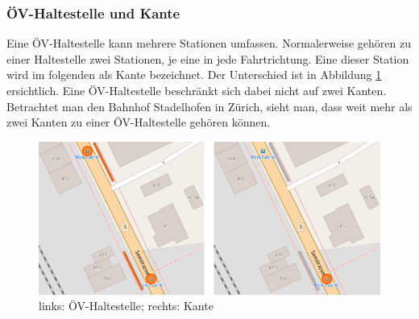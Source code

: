 \subsubsection{ÖV-Haltestelle und Kante}
\label{ÖV-Haltestelle und Kante}
Eine ÖV-Haltestelle kann mehrere Stationen umfassen. Normalerweise gehören zu einer Haltestelle zwei Stationen, je eine in jede Fahrtrichtung. Eine dieser Station wird im folgenden als Kante bezeichnet. Der Unterschied ist in Abbildung \ref{fig:public_transport_stop} ersichtlich. Eine ÖV-Haltestelle beschränkt sich dabei nicht auf zwei Kanten. Betrachtet man den Bahnhof Stadelhofen in Zürich, sieht man, dass weit mehr als zwei Kanten zu einer ÖV-Haltestelle gehören können.

\begin{figure}[ht]
\centering
\includegraphics[width=0.7\linewidth]{technicalreport/img/public_transport_stop}
\caption[Unterschied ÖV-Haltestelle und Kante]{links: ÖV-Haltestelle; rechts: Kante}
\label{fig:public_transport_stop}
\end{figure}
